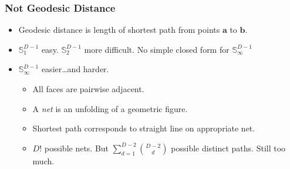 \documentclass[aspectratio=169,10pt,notes]{beamer}
\begin{document}
\begin{frame}
    \frametitle{Not Geodesic Distance}
    \label{pgpareto:notgeodesic}
    \begin{itemize}
        \item Geodesic distance is length of shortest path from points $\bm{a}$ to $\bm{b}$.
        \item $\mathbb{S}_1^{D-1}$ easy.  $\mathbb{S}_2^{D-1}$ more difficult. 
            No simple closed form for $\mathbb{S}_{\infty}^{D-1}$
        \item $\mathbb{S}_{\infty}^{D-1}$ easier\ldots and harder.
        \begin{itemize}
            \item All faces are pairwise adjacent.
            \item A \emph{net} is an unfolding of a geometric figure.  
            \item Shortest path corresponds to straight line on appropriate net.
            \item $D!$ possible nets.  But $\sum_{d = 1}^{D-2}\binom{D-2}{d}$ 
                possible distinct paths.  Still too much.
        \end{itemize}
    \end{itemize}
    \hyperlink{pgpareto:energyscore}{}
\end{frame} %
\end{document}
